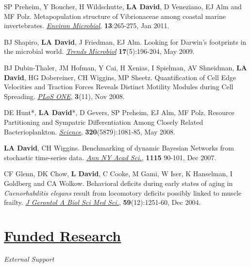 \documentclass[overlapped,line,11pt]{res}
\begin{document}
\begin{resume}
\begin{revnumerate}[13]
\vspace*{1mm}
\item {SP Preheim, Y Boucher, H Wildschutte, \textbf{LA David},
  D Veneziano, EJ Alm and MF Polz.  Metapopulation
  structure of Vibrionaceae among coastal marine
  invertebrates. \emph{\underline{Environ Microbiol}}, \textbf{13}:265-275, Jan 2011.} 

\vspace*{1mm}
\item {BJ Shapiro, \textbf{LA David}, J Friedman, EJ Alm. Looking for
Darwin's footprints in the microbial world.  \emph{\underline{Trends Microbiol}}
\textbf{17}(5):196-204, May 2009.}

\vspace*{1mm}
\item { BJ Dubin-Thaler, JM Hofman, Y Cai, H Xenias, I Spielman, AV
  Shneidman, \textbf{LA David}, HG Dobereiner, CH Wiggins, MP Sheetz.
  Quantification of Cell Edge Velocities and Traction Forces Reveals
  Distinct Motility Modules during Cell Spreading. \emph{\underline{PLoS ONE}},
  \textbf{3}(11), Nov 2008.}

\vspace*{1mm}
\item {DE Hunt*, \textbf{LA David}*, D Gevers, SP Preheim, EJ Alm, MF
Polz.  Resource Partitioning and Sympatric Differentiation Among
Closely Related Bacterioplankton.  \emph{\underline{Science}},
\textbf{320}(5879):1081-85, May 2008.}

\vspace*{1mm}
\item {\textbf{LA David}, CH Wiggins. Benchmarking of dynamic Bayesian
  Networks from stochastic time-series data. \emph{\underline{Ann NY Acad Sci.}},
  \textbf{1115} 90-101, Dec 2007.}

\vspace*{1mm}
\item {CF Glenn, DK Chow, \textbf{L David}, C Cooke, M Gami, W Iser, K
  Hanselman, I Goldberg and CA Wolkow. Behavioral deficits during
  early states of aging in {\em Caenorhabditis elegans} result from
  locomotory deficits possibly linked to muscle frailty. \emph{\underline{J
    Gerontol A Biol Sci Med Sci.}}, \textbf{59}(12):1251-60, Dec 2004.}
\end{revnumerate}

\section{\underline{\sc Funded Research}} 
\vspace{.1in}
\emph{External Support}
\vspace{.1in}


\end{resume}
\end{document}
